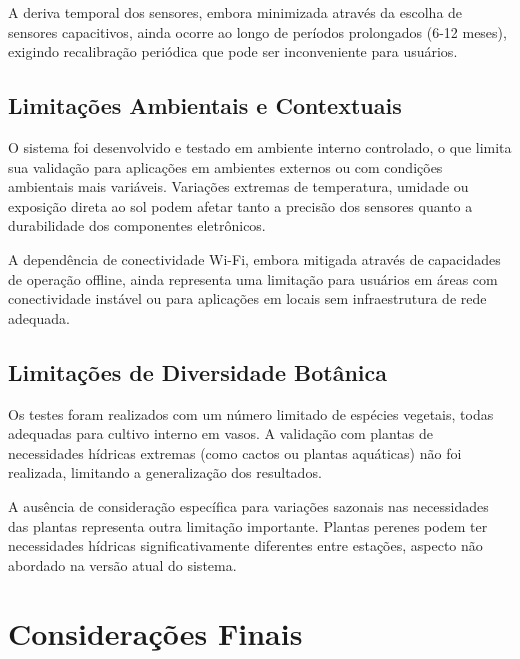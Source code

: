 \documentclass[twoside,english,brazilian]{UNISINOSmonografia}
\begin{document}
A deriva temporal dos sensores, embora minimizada através da escolha de sensores capacitivos, ainda ocorre ao longo de períodos prolongados (6-12 meses), exigindo recalibração periódica que pode ser inconveniente para usuários.

\subsection{Limitações Ambientais e Contextuais}

O sistema foi desenvolvido e testado em ambiente interno controlado, o que limita sua validação para aplicações em ambientes externos ou com condições ambientais mais variáveis. Variações extremas de temperatura, umidade ou exposição direta ao sol podem afetar tanto a precisão dos sensores quanto a durabilidade dos componentes eletrônicos.

A dependência de conectividade Wi-Fi, embora mitigada através de capacidades de operação offline, ainda representa uma limitação para usuários em áreas com conectividade instável ou para aplicações em locais sem infraestrutura de rede adequada.

\subsection{Limitações de Diversidade Botânica}

Os testes foram realizados com um número limitado de espécies vegetais, todas adequadas para cultivo interno em vasos. A validação com plantas de necessidades hídricas extremas (como cactos ou plantas aquáticas) não foi realizada, limitando a generalização dos resultados.

A ausência de consideração específica para variações sazonais nas necessidades das plantas representa outra limitação importante. Plantas perenes podem ter necessidades hídricas significativamente diferentes entre estações, aspecto não abordado na versão atual do sistema.


\section{Considerações Finais}
\end{document}
